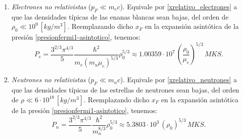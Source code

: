 \begin{enumerate}
\begin{enumerate}
\item \emph{Electrones no relativistas} ($p_F\ll m_{e}c$). Equivale por  \eqref{xrelativo_electrones} a que las densidades típicas de las enanas blancas sean bajas, del orden de $\rho_0\ll10^{9}\,[kg/m^3]$. Reemplazando dicho $x_F$ en la expansión asintótica de la presión \eqref{presionfermi1-asintotico}, tenemos:
\begin{equation}\label{fermi_norelativista}
 \boxed{P_e=\frac{3^{2/3}\pi^{4/3}}{5}\frac{\hbar^2}{m_e(m_u\mu_e)^{5/3}}\rho_0^{5/3}\approx1.00359\cdot 10^{7}\,\left(\frac{\rho_0}{\mu_e}\right)^{5/3}\,MKS.}
\end{equation}

\item \emph{Neutrones no relativistas} ($p_F\ll m_{n}c$). Equivale por  \eqref{xrelativo_neutrones} a que las densidades típicas de las estrellas de neutrones sean bajas, del orden de $\rho\ll6\cdot10^{18}\,[kg/m^3]$.  Reemplazando dicho $x_F$ en la expansión asintótica de la presión \eqref{presionfermi1-asintotico}, tenemos:
\begin{equation}\label{fermi_norelativista2}
 \boxed{P_n=\frac{3^{2/3}\pi^{4/3}}{5}\frac{\hbar^2}{m_n^{8/3}}\rho_0^{5/3}\approx5.3803\cdot 10^{3}\,\left(\rho_0\right)^{5/3}\,MKS.}
\end{equation}


\end{enumerate}
\end{enumerate}
